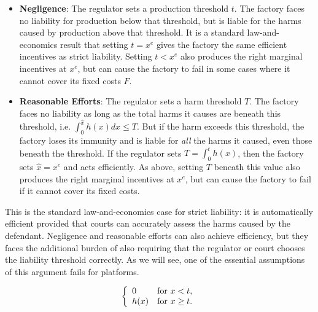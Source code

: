\begin{itemize}
\item \textbf{Negligence}: The regulator sets a production threshold $t$. The factory faces no liability for production below that threshold, but is liable for the harms caused by production above that threshold. It is a standard law-and-economics result that setting $t = x^e$ gives the factory the same efficient incentives as strict liability. Setting $t < x^e$ also produces the right marginal incentives at $x^e$, but can cause the factory to fail in some cases where it cannot cover its fixed costs $F$.
\item \textbf{Reasonable Efforts}: The regulator sets a harm threshold $T$. The factory faces no liability as long as the total harms it causes are beneath this threshold, i.e. $\int_0^{\hat{x}} h(x) dx \le T$. But if the harm exceeds this threshold, the factory loses its immunity and is liable for \emph{all} the harms it caused, even those beneath the threshold. If the regulator sets $T = \int_0^{t} h(x)$, then the factory sets $\hat{x} = x^e$ and acts efficiently. As above, setting $T$ beneath this value also produces the right marginal incentives at $x^e$, but can cause the factory to fail if it cannot cover its fixed costs.
\end{itemize}
This is the standard law-and-economics case for strict liability: it is automatically efficient provided that courts can accurately assess the harms caused by the defendant. Negligence and reasonable efforts can also achieve efficiency, but they faces the additional burden of also requiring that the regulator or court chooses the liability threshold correctly. As we will see, one of the essential assumptions of this argument fails for platforms.


\begin{equation}
\left\{\begin{array}{ll}
    0 & \mbox{for $x <t$}, \\
    h(x) & \mbox{for $x \ge t$}.
\end{array}\right.
\end{equation}


